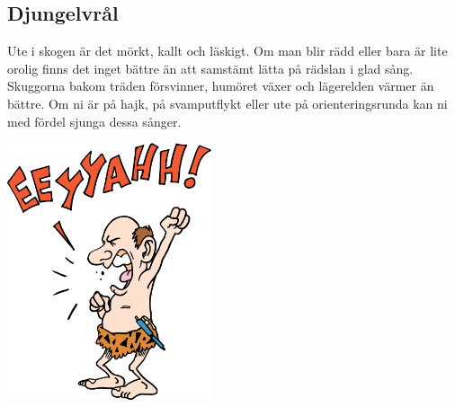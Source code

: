 \begin{flushleft}
\section{Djungelvrål}
{\Large
Ute i skogen är det mörkt, kallt och läskigt.
Om man blir rädd eller bara är lite orolig finns det inget bättre än att samstämt lätta på rädslan i glad sång.
Skuggorna bakom träden försvinner, humöret växer och lägerelden värmer än bättre.
Om ni är på hajk, på svamputflykt eller ute på orienteringsrunda kan ni med fördel sjunga dessa sånger.}
\end{flushleft}

\vspace{2cm}
\begin{center}
\includegraphics[width=6cm]{bilder/djungel.eps}
\end{center}
\newpage

\newpage
{}
\newpage
{}
\newpage
{}